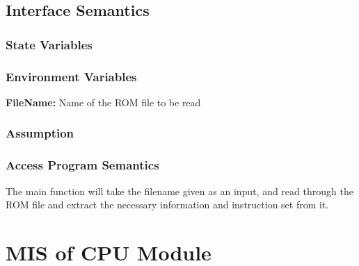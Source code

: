 \documentclass[12pt]{article}
\begin{document}
	\subsection{Interface Semantics}
		\subsubsection{State Variables}
		\subsubsection{Environment Variables}
			\textbf{FileName: } Name of the ROM file to be read
		\subsubsection{Assumption}
		\subsubsection{Access Program Semantics}
			The main function will take the filename given as an input, and read through the ROM file and extract the necessary information and instruction set from it. 

\section{MIS of CPU Module}
\end{document}
